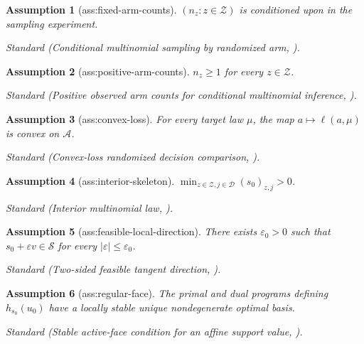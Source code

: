 \documentclass{article}
\newtheorem{assumption}{Assumption}
\begin{document}
\begin{assumption}[ass:fixed-arm-counts]\label{ass:fixed-arm-counts}
\((n_z:z\in\mathcal Z)\) is conditioned upon in the sampling experiment.
\par\smallskip\noindent\emph{Standard} (Conditional multinomial sampling by randomized arm, \cite{SongGuoChanRichardson2024}).
\end{assumption}

\begin{assumption}[ass:positive-arm-counts]\label{ass:positive-arm-counts}
\(n_z\ge 1\) for every \(z\in\mathcal Z\).
\par\smallskip\noindent\emph{Standard} (Positive observed arm counts for conditional multinomial inference, \cite{SongGuoChanRichardson2024}).
\end{assumption}

\begin{assumption}[ass:convex-loss]\label{ass:convex-loss}
For every target law \(\mu\), the map \(a\mapsto\ell(a,\mu)\) is convex on \(\mathcal A\).
\par\smallskip\noindent\emph{Standard} (Convex-loss randomized decision comparison, \cite{Blackwell1953}).
\end{assumption}

\begin{assumption}[ass:interior-skeleton]\label{ass:interior-skeleton}
\(\min_{z\in\mathcal Z,j\in\mathcal D}(s_0)_{z,j}>0\).
\par\smallskip\noindent\emph{Standard} (Interior multinomial law, \cite{GuoRichardson2021}).
\end{assumption}

\begin{assumption}[ass:feasible-local-direction]\label{ass:feasible-local-direction}
There exists \(\varepsilon_0>0\) such that \(s_0+\varepsilon v\in\mathcal S\) for every \(|\varepsilon|\le\varepsilon_0\).
\par\smallskip\noindent\emph{Standard} (Two-sided feasible tangent direction, \cite{Gafarov2025}).
\end{assumption}

\begin{assumption}[ass:regular-face]\label{ass:regular-face}
The primal and dual programs defining \(h_{s_0}(u_0)\) have a locally stable unique nondegenerate optimal basis.
\par\smallskip\noindent\emph{Standard} (Stable active-face condition for an affine support value, \cite{Gafarov2025}).
\end{assumption}
\end{document}
